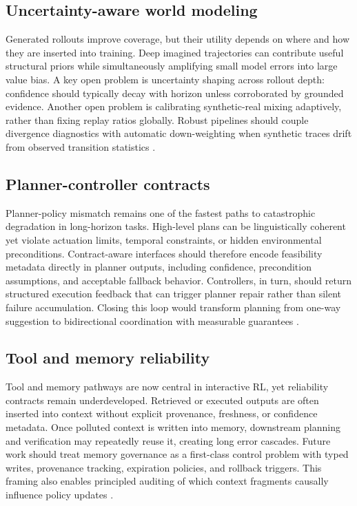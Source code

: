 \documentclass[pdflatex,sn-mathphys-num]{sn-jnl}
\begin{document}
\subsection{Uncertainty-aware world modeling}
Generated rollouts improve coverage, but their utility depends on where and how they are inserted into training. Deep imagined trajectories can contribute useful structural priors while simultaneously amplifying small model errors into large value bias. A key open problem is uncertainty shaping across rollout depth: confidence should typically decay with horizon unless corroborated by grounded evidence. Another open problem is calibrating synthetic-real mixing adaptively, rather than fixing replay ratios globally. Robust pipelines should couple divergence diagnostics with automatic down-weighting when synthetic traces drift from observed transition statistics \cite{arxiv_p_2301_12050,arxiv_p_2602_02454,arxiv_p_2602_11075,arxiv_p_2602_00785}.

\subsection{Planner-controller contracts}
Planner-policy mismatch remains one of the fastest paths to catastrophic degradation in long-horizon tasks. High-level plans can be linguistically coherent yet violate actuation limits, temporal constraints, or hidden environmental preconditions. Contract-aware interfaces should therefore encode feasibility metadata directly in planner outputs, including confidence, precondition assumptions, and acceptable fallback behavior. Controllers, in turn, should return structured execution feedback that can trigger planner repair rather than silent failure accumulation. Closing this loop would transform planning from one-way suggestion to bidirectional coordination with measurable guarantees \cite{arxiv_p_2204_01691,arxiv_p_2405_01534,arxiv_p_2512_12716,arxiv_p_2602_16165}.

\subsection{Tool and memory reliability}
Tool and memory pathways are now central in interactive RL, yet reliability contracts remain underdeveloped. Retrieved or executed outputs are often inserted into context without explicit provenance, freshness, or confidence metadata. Once polluted context is written into memory, downstream planning and verification may repeatedly reuse it, creating long error cascades. Future work should treat memory governance as a first-class control problem with typed writes, provenance tracking, expiration policies, and rollback triggers. This framing also enables principled auditing of which context fragments causally influence policy updates \cite{arxiv_p_2404_03648,arxiv_p_2511_14460,arxiv_p_2602_00994,arxiv_p_2601_07264}.
\end{document}
